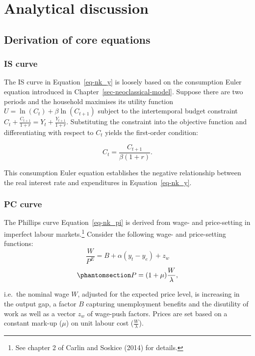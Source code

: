\documentclass[
  letterpaper,
  DIV=11,
  numbers=noendperiod]{scrreprt}
\begin{document}
\section{Analytical discussion}\label{sec-analytical}

\subsection{Derivation of core
equations}\label{derivation-of-core-equations}

\subsubsection{IS curve}\label{is-curve}

The IS curve in Equation~\ref{eq-nk_y} is loosely based on the
consumption Euler equation introduced in
Chapter~\ref{sec-neoclassical-model}. Suppose there are two periods and
the household maximises its utility function
\(U=\ln(C_t) + \beta \ln(C_{t+1})\) subject to the intertemporal budget
constraint \(C_t+\frac{C_{t+1}}{1+r}=Y_t + \frac{Y_{t+1}}{1+r}\).
Substituting the constraint into the objective function and
differentiating with respect to \(C_t\) yields the first-order
condition:

\[
C_t = \frac{C_{t+1}}{\beta(1+r)}.
\]

This consumption Euler equation establishes the negative relationship
between the real interest rate and expenditures in
Equation~\ref{eq-nk_y}.

\subsubsection{PC curve}\label{pc-curve}

The Phillips curve Equation~\ref{eq-nk_pi} is derived from wage- and
price-setting in imperfect labour markets.\footnote{See chapter 2 of
  Carlin and Soskice (2014) for details.} Consider the following wage-
and price-setting functions: \[
\frac{W}{P^E} = B + \alpha(y_t - y_e) + z_w 
\] \begin{equation}\phantomsection\label{eq-nk_P}{
P=(1+\mu)\frac{W}{\lambda},
}\end{equation}

i.e.~the nominal wage \(W\), adjusted for the expected price level, is
increasing in the output gap, a factor \(B\) capturing unemployment
benefits and the disutility of work as well as a vector \(z_w\) of
wage-push factors. Prices are set based on a constant mark-up (\(\mu\))
on unit labour cost (\(\frac{W}{\lambda}\)).
\end{document}
